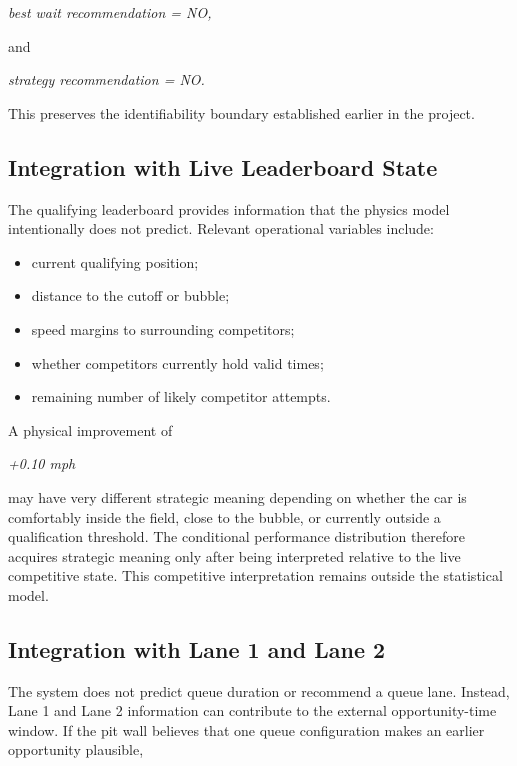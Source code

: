 \begin{center}\textit{best wait recommendation = NO,}\end{center}

and

\begin{center}\textit{strategy recommendation = NO.}\end{center}

This preserves the identifiability boundary established earlier in the project.

\subsection{Integration with Live Leaderboard State}
The qualifying leaderboard provides information that the physics model intentionally does not predict. Relevant operational variables include:

\begin{itemize}
\item current qualifying position;
\item distance to the cutoff or bubble;
\item speed margins to surrounding competitors;
\item whether competitors currently hold valid times;
\item remaining number of likely competitor attempts.
\end{itemize}

A physical improvement of

\begin{center}\textit{+0.10 mph}\end{center}

may have very different strategic meaning depending on whether the car is comfortably inside the field, close to the bubble, or currently outside a qualification threshold. The conditional performance distribution therefore acquires strategic meaning only after being interpreted relative to the live competitive state. This competitive interpretation remains outside the statistical model.

\subsection{Integration with Lane 1 and Lane 2}
The system does not predict queue duration or recommend a queue lane. Instead, Lane 1 and Lane 2 information can contribute to the external opportunity-time window. If the pit wall believes that one queue configuration makes an earlier opportunity plausible,

